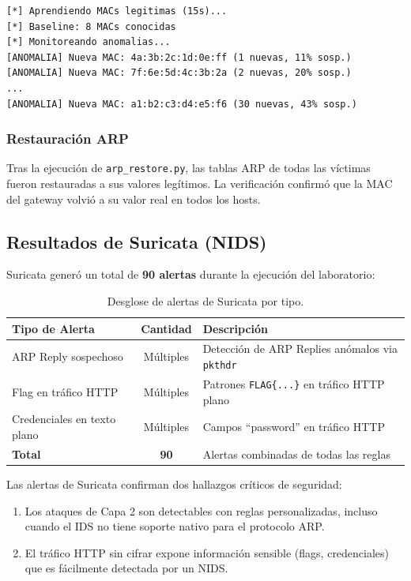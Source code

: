 \documentclass[12pt, a4paper]{article}
\begin{document}
\begin{lstlisting}[style=bashstyle, caption={Salida del detector de anomal\'ias MAC}]
[*] Aprendiendo MACs legitimas (15s)...
[*] Baseline: 8 MACs conocidas
[*] Monitoreando anomalias...
[ANOMALIA] Nueva MAC: 4a:3b:2c:1d:0e:ff (1 nuevas, 11% sosp.)
[ANOMALIA] Nueva MAC: 7f:6e:5d:4c:3b:2a (2 nuevas, 20% sosp.)
...
[ANOMALIA] Nueva MAC: a1:b2:c3:d4:e5:f6 (30 nuevas, 43% sosp.)
\end{lstlisting}

\subsubsection{Restauraci\'on ARP}

Tras la ejecuci\'on de \texttt{arp\_restore.py}, las tablas ARP de todas las v\'ictimas fueron restauradas a sus valores leg\'itimos. La verificaci\'on confirm\'o que la MAC del gateway volvi\'o a su valor real en todos los hosts.

\subsection{Resultados de Suricata (NIDS)}

Suricata gener\'o un total de \textbf{90 alertas} durante la ejecuci\'on del laboratorio:

\begin{table}[H]
    \centering
    \caption{Desglose de alertas de Suricata por tipo.}
    \label{tab:suricata-alerts}
    \begin{tabularx}{\textwidth}{|l|c|X|}
        \hline
        \textbf{Tipo de Alerta} & \textbf{Cantidad} & \textbf{Descripci\'on} \\
        \hline\hline
        ARP Reply sospechoso & M\'ultiples & Detecci\'on de ARP Replies an\'omalos via \texttt{pkthdr} \\
        \hline
        Flag en tr\'afico HTTP & M\'ultiples & Patrones \texttt{FLAG\{...\}} en tr\'afico HTTP plano \\
        \hline
        Credenciales en texto plano & M\'ultiples & Campos ``password'' en tr\'afico HTTP \\
        \hline
        \textbf{Total} & \textbf{90} & Alertas combinadas de todas las reglas \\
        \hline
    \end{tabularx}
\end{table}

Las alertas de Suricata confirman dos hallazgos cr\'iticos de seguridad:
\begin{enumerate}[leftmargin=2cm]
    \item Los ataques de Capa 2 son detectables con reglas personalizadas, incluso cuando el IDS no tiene soporte nativo para el protocolo ARP.
    \item El tr\'afico HTTP sin cifrar expone informaci\'on sensible (flags, credenciales) que es f\'acilmente detectada por un NIDS.
\end{enumerate}
\end{document}
